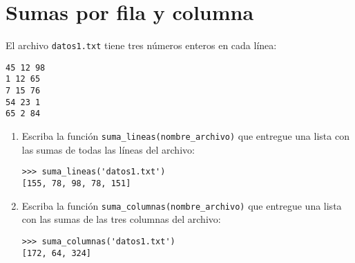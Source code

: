 \section{Sumas por fila y columna}

El archivo \lstinline!datos1.txt! tiene tres números enteros en cada
línea:

\begin{lstlisting}
45 12 98
1 12 65
7 15 76
54 23 1
65 2 84
\end{lstlisting}

\begin{enumerate}[1.]
\item
  Escriba la función \lstinline!suma_lineas(nombre_archivo)! que
  entregue una lista con las sumas de todas las líneas del archivo:

\begin{lstlisting}
>>> suma_lineas('datos1.txt')
[155, 78, 98, 78, 151]
\end{lstlisting}
\item
  Escriba la función \lstinline!suma_columnas(nombre_archivo)! que
  entregue una lista con las sumas de las tres columnas del archivo:

\begin{lstlisting}
>>> suma_columnas('datos1.txt')
[172, 64, 324]
\end{lstlisting}
\end{enumerate}

